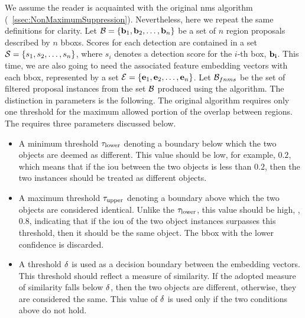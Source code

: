 We assume the reader is acquainted with the original \gls{nms} algorithm (\sectiontext{}~\ref{ssec:NonMaximumSuppression}). Nevertheless, here we repeat the same definitions for clarity. Let $\mathcal{B} = \left\{ {\mathbf{b}_1, \mathbf{b}_2, \dots, \mathbf{b}_n} \right\}$ be a set of $n$ region proposals described by $n$ \glspl{bbox}. Scores for each detection are contained in a set $\mathcal{S} = \left\{ {s_1, s_2, \dots, s_n} \right\}$, where $s_i$ denotes a detection score for the $i$-th box, $\mathbf{b_i}$. This time, we are also going to need the associated feature embedding vectors with each \gls{bbox}, represented by a set $\mathcal{E} = \left\{ {\mathbf{e}_1, \mathbf{e}_2, \dots, \mathbf{e}_n} \right\}$. Let $\mathcal{B}_{fnms}$ be  the set of filtered proposal instances from the set $\mathcal{B}$ produced using the \featurenms{} algorithm. The distinction in parameters is the following. The original algorithm requires only one threshold for the maximum allowed portion of the overlap between regions. The \featurenms{} requires three parameters discussed below.
\begin{itemize}
    \item A minimum threshold $\tau_{\text{lower}}$ denoting a boundary below which the two objects are deemed as different. This value should be low, for example, $0.2$, which means that if the \gls{iou} between the two objects is less than $0.2$, then the two instances should be treated as different objects.
    \item A maximum threshold $\tau_{\text{upper}}$ denoting a boundary above which the two objects are considered identical. Unlike the $\tau_{\text{lower}}$, this value should be high, \egtext{}, $0.8$, indicating that if the \gls{iou} of the two object instances surpasses this threshold, then it should be the same object. The \gls{bbox} with the lower confidence is discarded.
    \item A threshold $\delta$ is used as a decision boundary between the embedding vectors. This threshold should reflect a measure of similarity. If the adopted measure of similarity falls below $\delta$, then the two objects are different, otherwise, they are considered the same. This value of $\delta$ is used only if the two conditions above do not hold.
\end{itemize}

